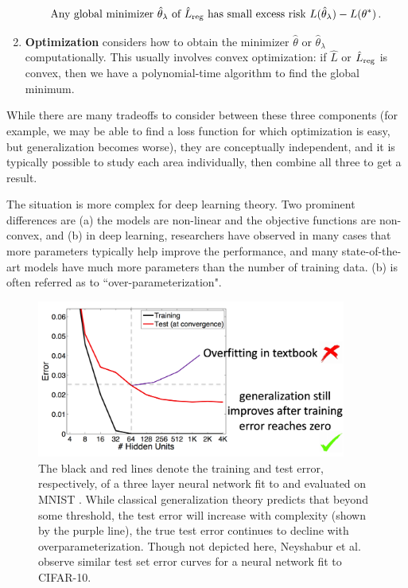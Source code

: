 \begin{enumerate}
\begin{equation}\label{lec9:eqn:classical-guarantee}
\text{Any global minimizer }\hat{\theta}_\lambda \text{ of } \hat{L}_{\textup{reg}} \textup{ has small excess risk }  L(\hat{\theta}_\lambda) - L(\theta^*)\,.
\end{equation}

\item {\bf Optimization} considers how to obtain the minimizer $\hat\theta$ or $\hat{\theta}_\lambda$ computationally. This usually involves convex optimization: if $\hat{L}$ or $\hat{L}_{\textup{reg}}$ is convex, then we have a polynomial-time algorithm to find the global minimum.
\end{enumerate}

While there are many tradeoffs to consider between these three components (for example, we may be able to find a loss function for which optimization is easy, but generalization becomes worse), they are conceptually independent, and it is typically possible to study each area individually, then combine all three to get a result.

The situation is more complex for deep learning theory. Two prominent differences are (a) the models are non-linear and the objective functions are non-convex, and (b) in deep learning, researchers have observed in many cases that more parameters typically help improve the performance, and many state-of-the-art models have much more parameters than the number of training data. (b) is often referred as to ``over-parameterization".

\begin{figure}[ht]
    \centerline{\includegraphics[width=4in]{figures/overparameterization.png}}
    \caption[lec9:fig:overparam]{The black and red lines denote the training and test error, respectively, of a three layer neural network fit to and evaluated on MNIST \cite{neyshabur2015norm}. While classical generalization theory predicts that beyond some threshold, the test error will increase with complexity (shown by the purple line), the true test error continues to decline with overparameterization. Though not depicted here, Neyshabur et al. observe similar test set error curves for a neural network fit to CIFAR-10.}
    \label{lec9:fig:overparam}
\end{figure}

